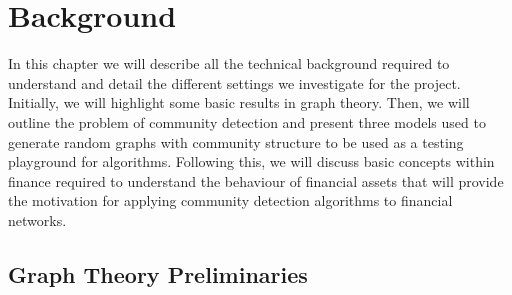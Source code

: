 
\chapter{Background}

\label{cha:background}


In this chapter we will describe all the technical background required to understand and detail the different settings we investigate for the project.
Initially, we will highlight some basic results in graph theory.
Then, we will outline the problem of community detection and present three models used to generate random graphs with community structure to be used as a testing playground for algorithms.
Following this, we will discuss basic concepts within finance required to understand the behaviour of financial assets that will provide the motivation for applying community detection algorithms to financial networks.


\section{Graph Theory Preliminaries}
\label{sec:graphTheoryBackground}

